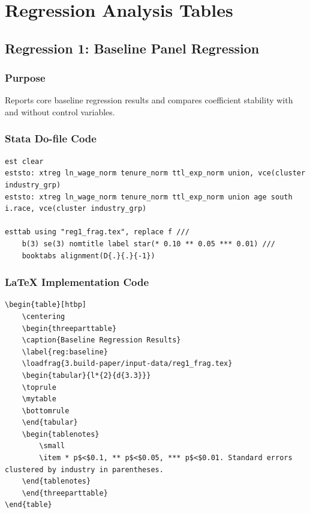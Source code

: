 \documentclass[11pt]{article}
\numberwithin{table}{section}
\newcommand{\loadfrag}[1]{%
	\begin{filecontents*}{#1}%
	\end{filecontents*}%
	\CatchFileDef{\mytable}{#1}{}%
}
\begin{document}
\clearpage
\section{Regression Analysis Tables}

\subsection{Regression 1: Baseline Panel Regression}
\subsubsection{Purpose}
Reports core baseline regression results and compares coefficient stability with and without control variables.

\subsubsection{Stata Do-file Code}
\begin{lstlisting}[style=stata]
est clear
eststo: xtreg ln_wage_norm tenure_norm ttl_exp_norm union, vce(cluster industry_grp)
eststo: xtreg ln_wage_norm tenure_norm ttl_exp_norm union age south i.race, vce(cluster industry_grp)

esttab using "reg1_frag.tex", replace f ///
    b(3) se(3) nomtitle label star(* 0.10 ** 0.05 *** 0.01) ///
    booktabs alignment(D{.}{.}{-1})
\end{lstlisting}

\subsubsection{LaTeX Implementation Code}
\begin{lstlisting}[style=latex]
\begin{table}[htbp]
    \centering
    \begin{threeparttable}
    \caption{Baseline Regression Results}
    \label{reg:baseline}
    \loadfrag{3.build-paper/input-data/reg1_frag.tex}
    \begin{tabular}{l*{2}{d{3.3}}}
    \toprule
    \mytable
    \bottomrule
    \end{tabular}
    \begin{tablenotes}
        \small
        \item * p$<$0.1, ** p$<$0.05, *** p$<$0.01. Standard errors clustered by industry in parentheses.
    \end{tablenotes}
    \end{threeparttable}
\end{table}
\end{lstlisting}
\end{document}
